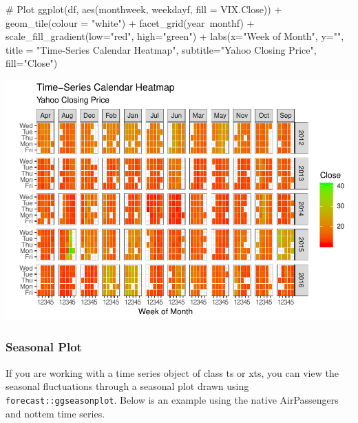 \documentclass[a4paper]{article}
\newenvironment{Shaded}{}{}
\newcommand{\KeywordTok}[1]{\textcolor[rgb]{0.00,0.00,1.00}{#1}}
\newcommand{\DataTypeTok}[1]{#1}
\newcommand{\StringTok}[1]{\textcolor[rgb]{0.00,0.50,0.50}{#1}}
\newcommand{\CommentTok}[1]{\textcolor[rgb]{0.00,0.50,0.00}{#1}}
\newcommand{\OperatorTok}[1]{#1}
\newcommand{\NormalTok}[1]{#1}
\begin{document}
\begin{Shaded}
\begin{Highlighting}[]
\CommentTok{# Plot}
\KeywordTok{ggplot}\NormalTok{(df, }\KeywordTok{aes}\NormalTok{(monthweek, weekdayf, }\DataTypeTok{fill =}\NormalTok{ VIX.Close)) }\OperatorTok{+}\StringTok{ }
\StringTok{  }\KeywordTok{geom_tile}\NormalTok{(}\DataTypeTok{colour =} \StringTok{"white"}\NormalTok{) }\OperatorTok{+}\StringTok{ }
\StringTok{  }\KeywordTok{facet_grid}\NormalTok{(year}\OperatorTok{~}\NormalTok{monthf) }\OperatorTok{+}\StringTok{ }
\StringTok{  }\KeywordTok{scale_fill_gradient}\NormalTok{(}\DataTypeTok{low=}\StringTok{"red"}\NormalTok{, }\DataTypeTok{high=}\StringTok{"green"}\NormalTok{) }\OperatorTok{+}
\StringTok{  }\KeywordTok{labs}\NormalTok{(}\DataTypeTok{x=}\StringTok{"Week of Month"}\NormalTok{,}
       \DataTypeTok{y=}\StringTok{""}\NormalTok{,}
       \DataTypeTok{title =} \StringTok{"Time-Series Calendar Heatmap"}\NormalTok{, }
       \DataTypeTok{subtitle=}\StringTok{"Yahoo Closing Price"}\NormalTok{, }
       \DataTypeTok{fill=}\StringTok{"Close"}\NormalTok{)}
\end{Highlighting}
\end{Shaded}

\includegraphics{M24-ggplot2_Gallery_files/figure-latex/unnamed-chunk-48-1.pdf}

\newpage

\newpage

\subsubsection{Seasonal Plot}\label{seasonal-plot}

If you are working with a time series object of class ts or xts, you can
view the seasonal fluctuations through a seasonal plot drawn using
\texttt{forecast::ggseasonplot}. Below is an example using the native
AirPassengers and nottem time series.
\end{document}
